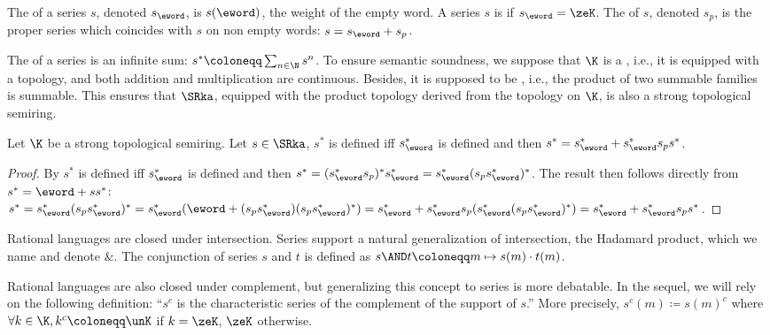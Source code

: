 \documentclass[a4paper,USenglish]{lipics}
\begin{document}
The  of a series $s$, denoted $s_\eword$, is $s(\eword)$,
the weight of the empty word.  A series $s$ is  if
$s_\eword = \zeK$. The  of $s$, denoted $s_p$, is the
proper series which coincides with $s$ on non empty words:
$s = s_\eword + s_p$.

The  of a series is an infinite sum: $s^* \coloneqq \sum_{n\in\N}s^n$.
To ensure semantic soundness, we suppose that $\K$ is a
, i.e., it is equipped with a topology, and both
addition and multiplication are continuous.  Besides, it is supposed to be
, i.e., the product of two summable families is summable.  This
ensures that $\SRka$, equipped with the product topology derived from the
topology on $\K$, is also a strong topological semiring.

\begin{Proposition}
  \label{prop:dev}
  Let $\K$ be a strong topological semiring. Let $s \in \SRka$,
$s^*$ is defined iff $s_\eword^*$ is defined and then
  $s^* = s_\eword^* + s_\eword^*s_ps^*$.
\end{Proposition}
\begin{proof}
  By \citep[Prop.~2.6, p.~396]{sakarovitch.09.eat} $s^*$ is defined iff
  $s_\eword^*$ is defined and then
  $s^* = (s_\eword^*s_p)^*s_{\eword}^* = s_\eword^*(s_ps_\eword^*)^*$.  The
  result then follows directly from $s^* = \eword + ss^*$:
  $s^* = s_\eword^*(s_ps_\eword^*)^* = s_\eword^*(\eword +
  (s_ps_\eword^*)(s_ps_\eword^*)^*) = s_\eword^* +
  s_\eword^*s_p(s_\eword^*(s_ps_\eword^*)^*) = s_\eword^* +
  s_\eword^*s_ps^*$.
\end{proof}

Rational languages are closed under intersection.  Series support a natural
generalization of intersection, the Hadamard product, which we name
 and denote $\&$.  The conjunction of series $s$ and $t$ is
defined as $s \AND t \coloneqq m \mapsto s(m) \cdot t(m)$.

Rational languages are also closed under complement, but generalizing this
concept to series is more debatable.  In the sequel, we will rely on the
following definition: ``$s^c$ is the characteristic series of the complement
of the support of $s$.''  More precisely, $s^c(m) \coloneqq s(m)^c$ where
$\forall k \in \K, k^c \coloneqq \unK$ if $k = \zeK$, $\zeK$ otherwise.
\end{document}
